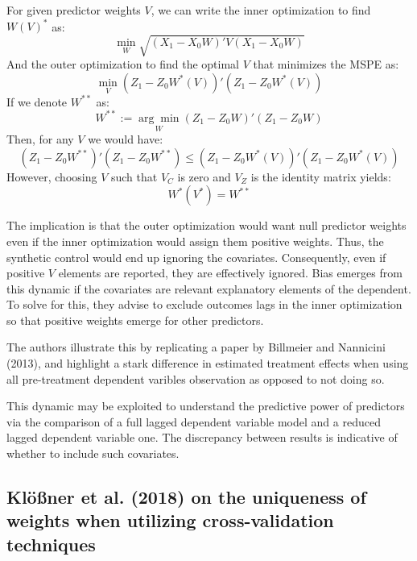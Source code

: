 \documentclass[12pt,a4paper,draft]{article}
\begin{document}
For given predictor weights $V$, we can write the inner optimization to find $W(V)^*$ as:
\begin{equation}
    \min_{W} \sqrt{(X_1-X_0 W)' V (X_1-X_0 W)}
\end{equation}
And the outer optimization to find the optimal $V$ that minimizes the MSPE as:
\begin{equation}
    \min_V (Z_1 - Z_0  W^*(V))' (Z_1 - Z_0 W^*(V))
\end{equation}
If we denote $W^{**}$ as:
\begin{equation}
    W^{**} := \underset{W}{\arg\min}  (Z_1 -Z_0 W)' (Z_1-Z_0 W) 
\end{equation}
Then, for any $V$ we would have:
\begin{equation}
    (Z_1-Z_0 W^{**})' (Z_1-Z_0 W^{**}) \le (Z_1 - Z_0  W^*(V))' (Z_1 - Z_0 W^*(V))
\end{equation}
However, choosing $V$ such that $V_C$ is zero and $V_Z$ is the identity matrix yields:
\begin{equation}
    W^* (V^*) = W^{**}
\end{equation}

The implication is that the outer optimization would want null predictor weights 
even if the inner optimization would assign them positive weights. Thus, the synthetic 
control would end up ignoring the covariates. Consequently, even if positive $V$ elements 
are reported, they are effectively ignored. Bias emerges from this dynamic if the 
covariates are relevant explanatory elements of the dependent. To solve for this, they 
advise to exclude outcomes lags in the inner optimization so that positive weights 
emerge for other predictors.

The authors illustrate this by replicating a paper by Billmeier and Nannicini (2013), 
and highlight a stark difference in estimated treatment effects when using all 
pre-treatment dependent varibles observation as opposed to not doing so. 

This dynamic may be exploited to understand the predictive power of predictors via the 
comparison of a full lagged dependent variable model and a reduced lagged dependent 
variable one. The discrepancy between results is indicative of whether to include 
such covariates.




\subsection{Klößner et al. (2018) on the uniqueness of weights when utilizing cross-validation techniques}
\end{document}
